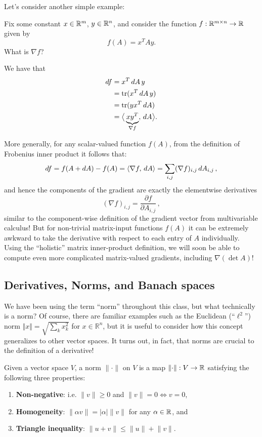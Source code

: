 Let's consider another simple example:

\begin{example}
Fix some constant $x \in \mathbb R^m$, $y\in \mathbb R^n$, and consider the function $f:\mathbb R^{m\times n} \to \mathbb R$ given by
\[
f(A) = x^T A y.
\]
What is $\nabla f$?
\end{example}
We have that 
\begin{align*}
    d f &= x^T \,d A \,y \\
    &= \operatorname{tr}( x^T \,d A\, y) \\
    &= \operatorname{tr}(y x^T \, d A) \\
    &= \big\langle \underbrace{x y^T}_{\nabla f} , \, d A \big\rangle.
\end{align*}

More generally, for any scalar-valued function $f(A)$, from the definition of Frobenius inner product it follows that:
$$
d f = f(A+d A)-f(A) = \langle \nabla f , \, d A \rangle = \sum_{i,j} (\nabla f)_{i,j} \, d A_{i,j} \, ,
$$
and hence the components of the gradient are exactly the elementwise derivatives
$$
(\nabla f)_{i,j} = \frac{\partial f}{\partial A_{i,j}} \, ,
$$
similar to the component-wise definition of the gradient vector from multivariable calculus!  But for non-trivial matrix-input functions $f(A)$ it can be extremely awkward to take the derivative with respect to each entry of $A$ individually.
Using the ``holistic'' matrix inner-product definition, we will soon be able to compute even more complicated matrix-valued gradients, including  $\nabla (\det A)$!

\subsection{Derivatives, Norms, and Banach spaces}
\label{sec:banach}

We have been using the term ``norm'' throughout this class, but what technically is a norm?  Of course, there are familiar examples such as the Euclidean (``$\ell^2$'') norm $\Vert x \Vert = \sqrt{\sum_k x_k^2}$ for $x\in \mathbb{R}^n$, but it is useful to consider how this concept generalizes to other vector spaces.   It turns out, in fact, that norms are crucial to the definition of a derivative!

Given a vector space $V$, a norm $\lVert \cdot \rVert$ on $V$ is a map $\lVert \cdot \rVert: V\to \mathbb R$ satisfying the following three properties:
\begin{enumerate}
    \item \textbf{Non-negative}: i.e. $\lVert v \rVert \geq 0$ and $\lVert v \rVert = 0 \iff v = 0$,
    \item \textbf{Homogeneity}: $\lVert \alpha v \rVert = |\alpha |\lVert v \rVert$ for any $\alpha \in \mathbb R$, and 
    \item \textbf{Triangle inequality}: $\lVert u + v\rVert \leq \lVert u \rVert + \lVert v \rVert$.
\end{enumerate}

